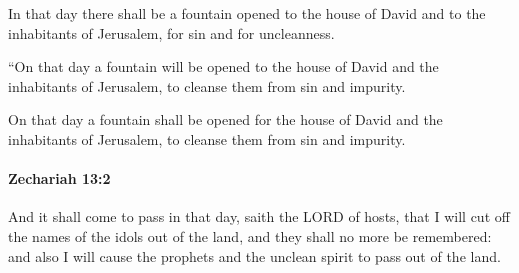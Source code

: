 			\begin{versebox}
					\item[BHS] 
					\item[LXX] 
					\item[ASV] In that day there shall be a fountain opened to the house of David and to the inhabitants of Jerusalem, for sin and for uncleanness.
					\item[NIV] “On that day a fountain will be opened to the house of David and the inhabitants of Jerusalem, to cleanse them from sin and impurity.
					\item[NRSV] On that day a fountain shall be opened for the house of David and the inhabitants of Jerusalem, to cleanse them from sin and impurity.
			\end{versebox}

		\paragraph{Zechariah 13:2} %
			\label{ZECHARIAH-13-2}

			And it shall come to pass in that day, saith the LORD of hosts, that I will cut off the names of the idols out of the land, and they shall no more be remembered: and also I will cause the prophets and the unclean spirit to pass out of the land.

